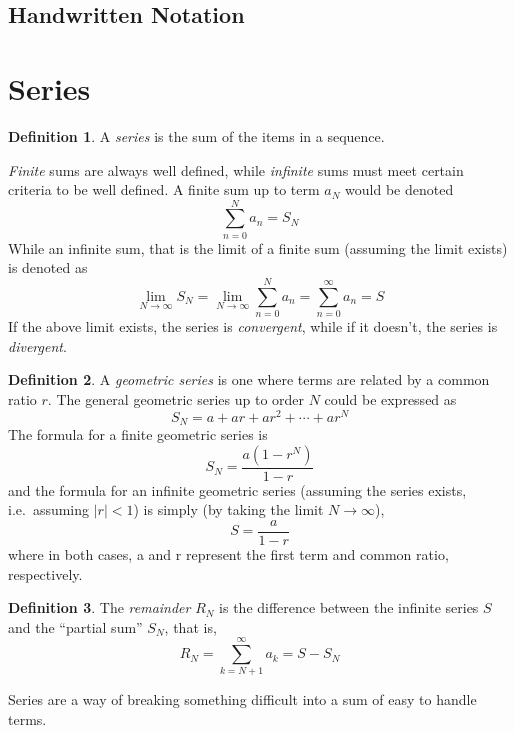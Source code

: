 \documentclass[10pt]{scrartcl}
\numberwithin{equation}{subsection}
\theoremstyle{definition}
\newtheorem{definition}{Definition}[section]
\theoremstyle{remark}
\newenvironment{definitionSR}
{
\begin{siderules}
\begin{definition}
}
{
\end{definition}
\end{siderules}
}
\begin{document}
\subsection{Handwritten Notation}

\section{Series}
\begin{definitionSR}
A \textit{series} is the sum of the items in a sequence.
\end{definitionSR}


\emph{Finite} sums are always well defined, while \emph{infinite} sums must meet certain criteria to be well defined. A finite sum up to term $a_N$ would be denoted
\[
	\sum_{n=0}^N a_n = S_N
\]
While an infinite sum, that is the limit of a finite sum (assuming the limit exists) is denoted as
\[
	\lim_{N \to \infty} S_N = \lim_{N \to \infty} \sum_{n=0}^N a_n = \sum_{n=0}^\infty a_n = S
\]
If the above limit exists, the series is \textit{convergent}, while if it doesn't, the series is \textit{divergent}.

\begin{definitionSR}
A \textit{geometric series} is one where terms are related by a common ratio $r$. The general geometric series up to order $N$ could be expressed as
  \[
      S_N = a + ar + ar^2 + \cdots + ar^N
  \]
The formula for a finite geometric series is
  \begin{equation}
  S_N = \frac{a(1-r^N)}{1-r}
  \end{equation}
and the formula for an infinite geometric series (assuming the series exists, i.e.\ assuming $|r|<1$) is simply (by taking the limit $N \to \infty$),
  \begin{equation}
  S = \frac{a}{1-r}
  \end{equation}
where in both cases, a and r represent the first term and common ratio, respectively.\\
\end{definitionSR}


\begin{definitionSR}
The \textit{remainder} $R_N$ is the difference between the infinite series $S$ and the ``partial sum'' $S_N$, that is,
\[
	R_N = \sum_{k=N+1}^\infty a_k = S-S_N
\]
\end{definitionSR}

Series are a way of breaking something difficult into a sum of easy to handle
terms.
\end{document}
